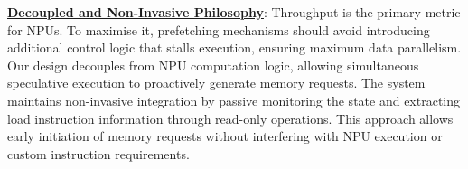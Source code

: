 \noindent \textbf{\underline{Decoupled and Non-Invasive Philosophy}}:
Throughput is the primary metric for NPUs. To maximise it, prefetching mechanisms should avoid introducing additional control logic that stalls execution, ensuring maximum data parallelism\cite{hameed2010understanding}. 
Our design decouples from NPU computation logic, allowing simultaneous speculative execution to proactively generate memory requests.
The system maintains non-invasive integration by passive monitoring the state and extracting load instruction information through read-only operations. 
This approach allows early initiation of memory requests without interfering with NPU execution or custom instruction requirements.


